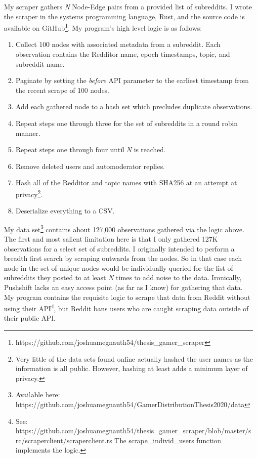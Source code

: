 \documentclass[12pt, a4paper]{article}
\begin{document}
My scraper gathers \textit{N} Node-Edge pairs from a provided list of subreddits. I wrote the scraper in the systems programming language, Rust, and the source code is available on GitHub\footnote{https://github.com/joshuamegnauth54/thesis\_gamer\_scraper}. My program's high level logic is as follows: 

\begin{enumerate}
  \item Collect 100 nodes with associated metadata from a subreddit. Each observation contains the Redditor name, epoch timestamps, topic, and subreddit name.
  \item Paginate by setting the \textit{before} API parameter to the earliest timestamp from the recent scrape of 100 nodes.
  \item Add each gathered node to a hash set which precludes duplicate observations.
  \item Repeat steps one through three for the set of subreddits in a round robin manner.
  \item Repeat steps one through four until \textit{N} is reached.
  \item Remove deleted users and automoderator replies.
  \item Hash all of the Redditor and topic names with SHA256 at an attempt at privacy\footnote{Very little of the data sets found online actually hashed the user names as the information is all public. However, hashing at least adds a minimum layer of privacy.}.
  \item Deserialize everything to a CSV.
\end{enumerate}

My data set\footnote{Available here: https://github.com/joshuamegnauth54/GamerDistributionThesis2020/data} contains about 127,000 observations gathered via the logic above. The first and most salient limitation here is that I only gathered 127K observations for a select set of subreddits. I originally intended to perform a breadth first search by scraping outwards from the nodes. So in that case each node in the set of unique nodes would be individually queried for the list of subreddits they posted to at least \textit{N} times to add noise to the data. Ironically, Pushshift lacks an easy access point (as far as I know) for gathering that data. My program contains the requisite logic to scrape that data from Reddit without using their API\footnote{See: https://github.com/joshuamegnauth54/thesis\_gamer\_scraper/blob/master/src/scraperclient/scraperclient.rs The scrape\_individ\_users function implements the logic.}, but Reddit bans users who are caught scraping data outside of their public API.
\end{document}
